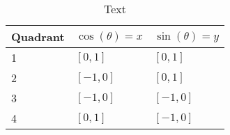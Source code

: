 \begin{table}
	\caption{Text}
	\label{tab:quadrants_trig_vals}
	\centering
	\begin{tabular}{lll}
		\toprule
		Quadrant & $\cos(\theta)=x$ & $\sin(\theta)=y$\\
		\midrule
		\rowcolor{xred!35}1 & $\left[ 0,1 \right]$ & $\left[ 0,1 \right]$\\
		\rowcolor{xblue!35}2 & $\left[-1,0 \right]$ & $\left[ 0,1 \right]$\\
		\rowcolor{xgreen!35}3 & $\left[-1,0 \right]$ & $\left[-1,0 \right]$\\
		\rowcolor{xorange!35}4 & $\left[ 0,1 \right]$ & $\left[-1,0 \right]$\\
		\bottomrule
	\end{tabular}
\end{table}

